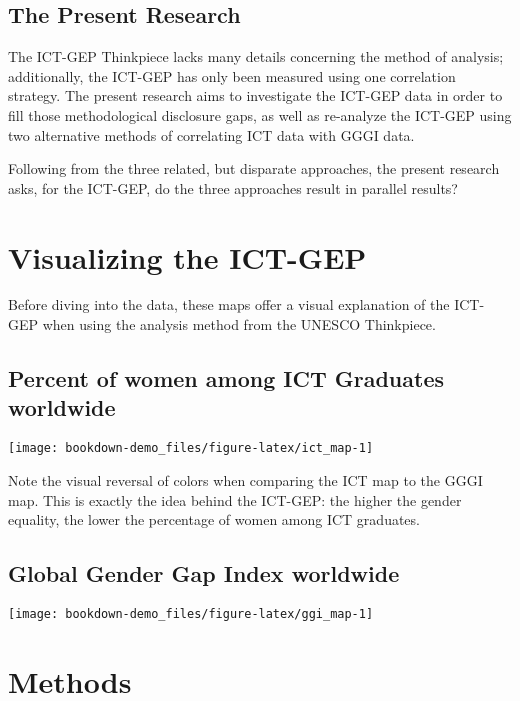 \documentclass[]{book}
\begin{document}
\section{The Present Research}\label{the-present-research}

The ICT-GEP Thinkpiece lacks many details concerning the method of
analysis; additionally, the ICT-GEP has only been measured using one
correlation strategy. The present research aims to investigate the
ICT-GEP data in order to fill those methodological disclosure gaps, as
well as re-analyze the ICT-GEP using two alternative methods of
correlating ICT data with GGGI data.

Following from the three related, but disparate approaches, the present
research asks, for the ICT-GEP, do the three approaches result in
parallel results?

\chapter{Visualizing the ICT-GEP}\label{maps}

Before diving into the data, these maps offer a visual explanation of
the ICT-GEP when using the analysis method from the UNESCO Thinkpiece.

\section{Percent of women among ICT Graduates
worldwide}\label{percent-of-women-among-ict-graduates-worldwide}

\begin{center}\texttt{[image: bookdown-demo\_files/figure-latex/ict\_map-1]} \end{center}

Note the visual reversal of colors when comparing the ICT map to the
GGGI map. This is exactly the idea behind the ICT-GEP: the higher the
gender equality, the lower the percentage of women among ICT graduates.

\section{Global Gender Gap Index
worldwide}\label{global-gender-gap-index-worldwide}

\begin{center}\texttt{[image: bookdown-demo\_files/figure-latex/ggi\_map-1]} \end{center}

\chapter{Methods}\label{methods}
\end{document}
